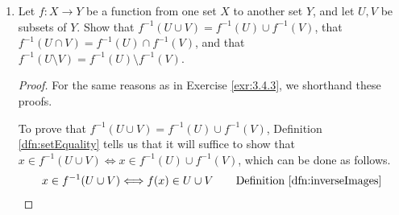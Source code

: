 \documentclass[../main.tex]{subfiles}
\begin{document}
\begin{enumerate}[ref={\thesection.\arabic*}]
\begin{proof}
\begin{align*}
        \end{align*}
        Because of the transitivity of logically equivalent statements (we may induct the result of Exercise \ref{exr:A.1.5}), we have shown what was desired.\par
        As to the other part of the question, it is \emph{not} true that the $\subseteq$ relation can be improved to $=$ for the first or the second statement, which we may verify thorugh two counterexamples, as follows. For the first statement, let $X=\{1,2\}$, $Y=\{3,4\}$, $A=\{1\}$, $B=\{2\}$, and $f:\{1,2\}\to\{3,4\}$ be defined by $f(x):=3$. Then we have $f(A)\cap f(B)=\{3\}$, but $f(A\cap B)=\{\}$. Thus, $3\in f(A)\cap f(B)$, but $3\notin f(A\cap B)$. Note that the break down in the would-be reverse proof of $f(A\cap B)\subseteq f(A)\cap f(B)$ comes from the fact that although $y\in f(A)\cap f(B) \Longrightarrow y=f(x)$ for some $x\in A$ and $y=f(x')$ for some $x'\in B$, we cannot guarantee that $x=x'$ (unless $f$ is injective), i.e., that $x\in A\cap B$. As to the second statement, we consider the same function, except that we let $A=\{1,2\}$. Thus, we have $f(A\setminus B)=\{3\}$, but $f(A)\setminus f(B)=\{\}$, implying that $3\in f(A\setminus B)$ but $3\notin f(A)\setminus f(B)$. Note that the breakdown in the would-be reverse proof of $f(A)\setminus f(B)\subseteq f(A\setminus B)$ comes from the fact that although $y\in f(A\setminus B) \Longrightarrow y=f(x)$ for some $x\in A$, we cannot guarantee that there exists no $x'\in B$ such that $y=f(x')$ (unless $f$ is injective).
    \end{proof}
    \item \label{exr:3.4.4}Let $f:X\to Y$ be a function from one set $X$ to another set $Y$, and let $U,V$ be subsets of $Y$. Show that $f^{-1}(U\cup V)=f^{-1}(U)\cup f^{-1}(V)$, that $f^{-1}(U\cap V)=f^{-1}(U)\cap f^{-1}(V)$, and that $f^{-1}(U\setminus V)=f^{-1}(U)\setminus f^{-1}(V)$.
    \begin{proof}
        For the same reasons as in Exercise \ref{exr:3.4.3}, we shorthand these proofs.\par
        To prove that $f^{-1}(U\cup V)=f^{-1}(U)\cup f^{-1}(V)$, Definition \ref{dfn:setEquality} tells us that it will suffice to show that $x\in f^{-1}(U\cup V) \Longleftrightarrow x\in f^{-1}(U)\cup f^{-1}(V)$, which can be done as follows.
        \begin{align*}
            x\in f^{-1}(U\cup V) &\Longleftrightarrow f(x)\in U\cup V \tag*{Definition \ref{dfn:inverseImages}}\\

\end{align*}
\end{proof}
\end{enumerate}
\end{document}
